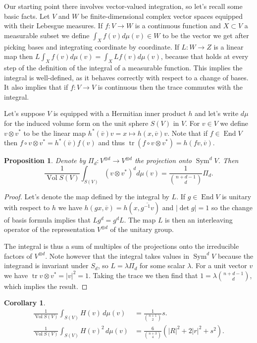 \documentclass[10pt,a4paper]{amsart}
\newtheorem{prop}[theo]{Proposition}
\newtheorem{coro}[theo]{Corollary}
\theoremstyle{definition}
\def\ov#1{\overline{#1}}
\DeclareMathOperator{\Sym}{Sym}
\DeclareMathOperator{\tr}{tr}
\DeclareMathOperator{\Vol}{Vol}
\DeclareMathOperator{\End}{End}
\begin{document}
Our starting point there involves vector-valued integration, so let's recall
some basic facts.
Let $V$ and $W$ be finite-dimensional complex vector spaces equipped with their
Lebesgue measures.
If $f : V \to W$ is a continuous function and $X \subset V$ a measurable subset
we define $\int_X f(v) d\mu(v) \in W$ to be the vector we get after picking
bases and integrating coordinate by coordinate.
If $L : W \to Z$ is a linear map then $L \int_X f(v) d\mu(v) = \int_X Lf(v)
d\mu(v)$, because that holds at every step of the definition of the integral of
a measurable function.
This implies the integral is well-defined, as it behaves correctly with respect
to a change of bases.
It also implies that if $f : V \to V$ is continuous then the trace commutes
with the integral.

Let's suppose $V$ is equipped with a Hermitian inner product $h$
and let's write $d\mu$ for the induced volume form on the unit sphere $S(V)$ in
$V$. For $v \in V$ we define $v \otimes v^*$ to be the linear map
$h^*(\ov v) v = x \mapsto h(x, \ov v) v$.
Note that if $f \in \End V$ then $f \circ v \otimes v^* = h^*(\ov v) f(v)$
and thus $\tr(f \circ v \otimes v^*) = h(fv, \ov v)$.

\begin{prop}
\label{prop:int-id}
Denote by $\Pi_d : V^{\otimes d} \to V^{\otimes d}$ the projection onto $\Sym^d V$.
Then
$$
\frac{1}{\Vol S(V)}
\int_{S(V)} (v \otimes v^*)^{d} d\mu(v)
= \frac{1}{\binom{n+d-1}{d}} \Pi_d.
$$
\end{prop}

\begin{proof}
Let's denote the map defined by the integral by $L$. If $g \in \End V$ is
unitary with respect to $h$ we have $h(g x, \ov v) = h(x, \ov{g^{-1} v})$ and
$|\!\det g| = 1$ so the change of basis formula implies that $L g^d = g^d L$.
The map $L$ is then an interleaving operator of the representation $V^{\otimes d}$
of the unitary group.

The integral is thus a sum of multiples of the projections onto the irreducible
factors of $V^{\otimes d}$.
Note however that the integral takes values in $\Sym^d V$ because the integrand
is invariant under $S_d$, so $L = \lambda \Pi_d$ for some scalar $\lambda$.
For a unit vector $v$ we have $\tr v \otimes v^* = |v|^2 = 1$.
Taking the trace we then find that $1 = \lambda \binom{n+d-1}{d}$,
which implies the result.
\end{proof}


\begin{coro}
\begin{align*}
\frac{1}{\Vol S(V)} \int_{S(V)} H(v) \, d\mu(v)
&= \frac{1}{\binom{n+1}{2}} s.
\\
\frac{1}{\Vol S(V)}
\int_{S(V)} H(v)^2 \, d\mu(v)
&=
\frac{6}{\binom{n+3}4} (|R|^2 + 2|r|^2 + s^2).
\end{align*}
\end{coro}
\end{document}
